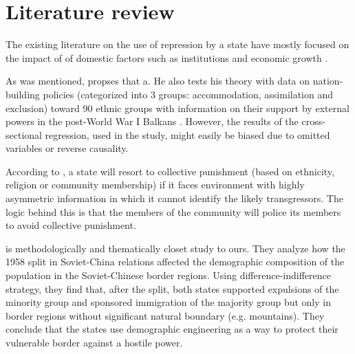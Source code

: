 \documentclass[12pt]{article}
\begin{document}






\section{Literature review}
The existing literature on the use of repression by a state have mostly focused on the impact of  of domestic factors such as institutions and economic growth \citep{davenport_state_2007, davenport_state_2007-1}.

As was mentioned, \citet{mylonas_politics_2013} propses that a. He also tests his theory with data on nation-building policies (categorized into 3 groups: accommodation, assimilation and exclusion)  toward  90 ethnic groups with information on their support by external powers in the post-World War I Balkans . However, the results of the cross-sectional regression, used in the study, might easily be biased due to omitted variables or reverse causality. 

According to \citet{blaydes_state_2018}, a state will resort to collective punishment (based on ethnicity, religion or community membership) if it faces environment with highly asymmetric information in which it cannot identify the likely transgressors. The logic behind this is that the members of the community will police its members to avoid collective punishment. 

\citet{mcnamee_demographic_nodate} is methodologically and thematically closet study to ours. They analyze how the 1958 split in Soviet-China relations affected the demographic composition of the population in the Soviet-Chinese border regions.
Using difference-indifference strategy, they find that, after the split,  both states supported expulsions  of the minority group and sponsored immigration of the majority group but only in border regions without significant natural boundary (e.g. mountains). They conclude that the states use demographic engineering as a way to protect their vulnerable border against a hostile power. 
\end{document}

